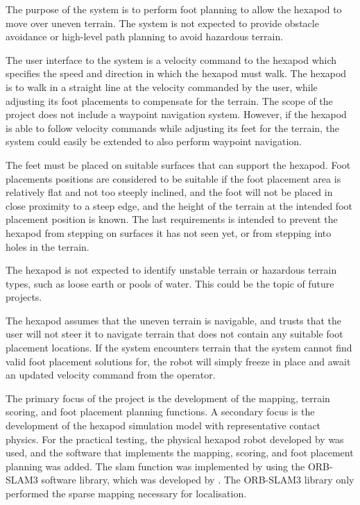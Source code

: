     The purpose of the system is to perform foot planning to allow the hexapod to move over uneven terrain. The system is not expected to provide obstacle avoidance or high-level path planning to avoid hazardous terrain.

    The user interface to the system is a velocity command to the hexapod which specifies the speed and direction in which the hexapod must walk. The hexapod is to walk in a straight line at the velocity commanded by the user, while adjusting its foot placements to compensate for the terrain. The scope of the project does not include a waypoint navigation system. However, if the hexapod is able to follow velocity commands while adjusting its feet for the terrain, the system could easily be extended to also perform waypoint navigation.

    The feet must be placed on suitable surfaces that can support the hexapod. Foot placements positions are considered to be suitable if the foot placement area is relatively flat and not too steeply inclined, and the foot will not be placed in close proximity to a steep edge, and the height of the terrain at the intended foot placement position is known. The last requirements is intended to prevent the hexapod from stepping on surfaces it has not seen yet, or from stepping into holes in the terrain.

    The hexapod is not expected to identify unstable terrain or hazardous terrain types, such as loose
    earth or pools of water. This could be the topic of future projects.

    The hexapod assumes that the uneven terrain is navigable, and trusts that the user will not steer
    it to navigate terrain that does not contain any suitable foot placement locations. If the system encounters
    terrain that the system cannot find valid foot placement solutions for, the robot will simply freeze in place and await an updated velocity command from the
    operator.

    The primary focus of the project is the development of the mapping, terrain scoring, and foot placement planning
    functions. A secondary focus is the development of the hexapod simulation model with representative contact physics.
    For the practical testing, the physical hexapod robot developed by \cite{erasmus2023guidance} was used, and the software
    that implements the  mapping, scoring, and foot placement planning was added. The \ac{slam} function was implemented
    by using the ORB-SLAM3 software library, which was developed by \cite{campos2021orb}. The ORB-SLAM3 library only performed
    the sparse mapping necessary for localisation.

